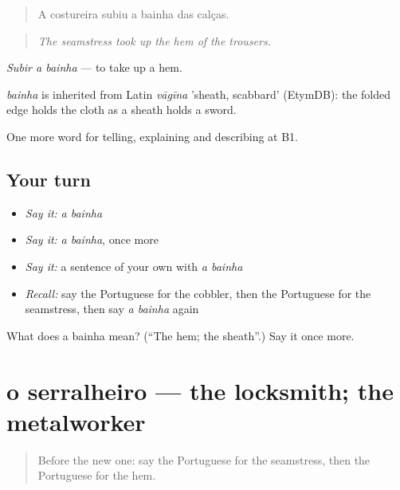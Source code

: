 \begin{quote}
A costureira subiu a bainha das calças.
\end{quote}

\begin{quote}
\emph{The seamstress took up the hem of the trousers.}
\end{quote}

\emph{Subir a bainha} — to take up a hem.

\begin{cousinweb}
\emph{bainha} is inherited from Latin \emph{vāgīna} 'sheath, scabbard' (EtymDB): the folded edge holds the cloth as a sheath holds a sword.
\end{cousinweb}

\begin{grammarlens}[title={What you've built}]
One more word for telling, explaining and describing at B1.
\end{grammarlens}

\subsection*{Your turn}
\begin{itemize}
\raggedright
  \item \emph{Say it:} \emph{a bainha}
  \item \emph{Say it:} \emph{a bainha}, once more
  \item \emph{Say it:} a sentence of your own with \emph{a bainha}
  \item \emph{Recall:} say the Portuguese for the cobbler, then the Portuguese for the seamstress, then say \emph{a bainha} again
\end{itemize}

\begin{tcolorbox}[breakable,colback=teal!4,colframe=teal!35!black,title={Before you move on}]
What does a bainha mean? (\textquotedblleft{}The hem; the sheath\textquotedblright{}.) Say it once more.
\end{tcolorbox}
\section[o serralheiro]{o serralheiro — the locksmith; the metalworker}

\label{lesson:PT-C451-serralheiro}



\begin{quote}
Before the new one: say the Portuguese for the seamstress, then the Portuguese for the hem.
\end{quote}

